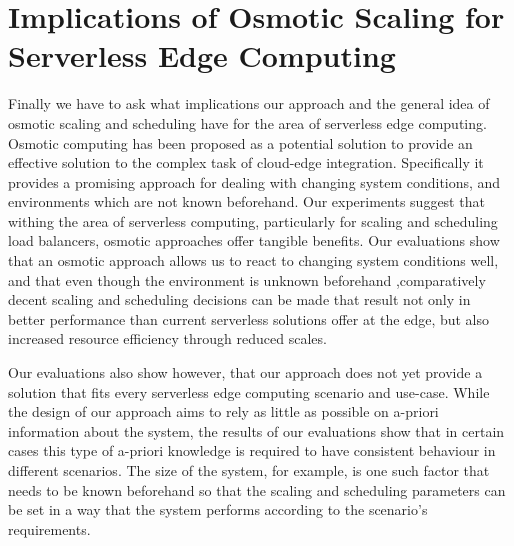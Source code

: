 \documentclass[draft,final]{vutinfth} %
\begin{document}


\section{Implications of Osmotic Scaling for Serverless Edge Computing}

Finally we have to ask what implications our approach and the general idea of osmotic scaling and scheduling have for the area of serverless edge computing.
Osmotic computing has been proposed as a potential solution to provide an effective solution to the complex task of cloud-edge integration\cite{osmotic-middleware-rausch}.
Specifically it provides a promising approach for dealing with changing system conditions, and environments which are not known beforehand.
Our experiments suggest that withing the area of serverless computing, particularly for scaling and scheduling load balancers, osmotic approaches offer tangible benefits.
Our evaluations show that an osmotic approach allows us to react to changing system conditions well, and that even though the environment is unknown beforehand ,comparatively decent scaling and scheduling decisions can be made that result not only in better performance than current serverless solutions offer at the edge, but also increased resource efficiency through reduced scales.

Our evaluations also show however, that our approach does not yet provide a solution that fits every serverless edge computing scenario and use-case.
While the design of our approach aims to rely as little as possible on a-priori information about the system, the results of our evaluations show that in certain cases this type of a-priori knowledge is required to have consistent behaviour in different scenarios. 
The size of the system, for example, is one such factor that needs to be known beforehand so that the scaling and scheduling parameters can be set in a way that the system performs according to the scenario's requirements.
\end{document}
